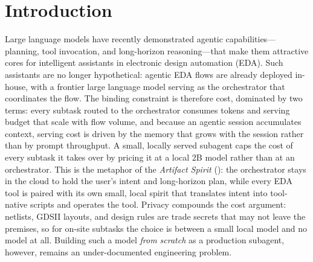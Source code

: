 \section{Introduction}

Large language models have recently demonstrated agentic capabilities---planning, tool invocation, and long-horizon reasoning---that make them attractive cores for intelligent assistants in electronic design automation (EDA).
Such assistants are no longer hypothetical: agentic EDA flows are already deployed in-house, with a frontier large language model serving as the orchestrator that coordinates the flow.
The binding constraint is therefore cost, dominated by two terms: every subtask routed to the orchestrator consumes tokens and serving budget that scale with flow volume, and because an agentic session accumulates context, serving cost is driven by the memory that grows with the session rather than by prompt throughput.
A small, locally served subagent caps the cost of every subtask it takes over by pricing it at a local 2B model rather than at an orchestrator.
This is the metaphor of the \emph{Artifact Spirit} (\qi): the orchestrator stays in the cloud to hold the user's intent and long-horizon plan, while every EDA tool is paired with its own small, local spirit that translates intent into tool-native scripts and operates the tool.
Privacy compounds the cost argument: netlists, GDSII layouts, and design rules are trade secrets that may not leave the premises, so for on-site subtasks the choice is between a small local model and no model at all.
Building such a model \emph{from scratch} as a production subagent, however, remains an under-documented engineering problem.

